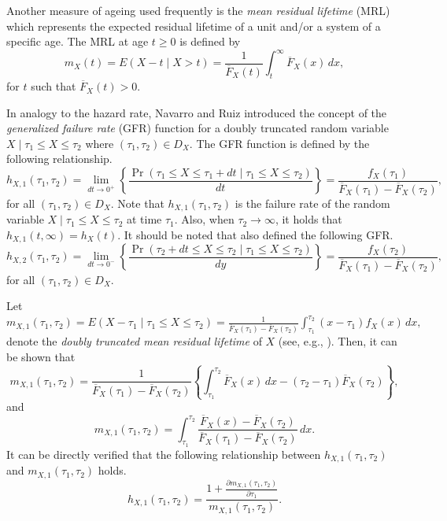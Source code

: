 \documentclass[11pt]{article}
\begin{document}
Another measure of ageing used frequently is the \textit{mean residual lifetime} (MRL) which represents the expected residual lifetime of a unit and/or a system of a specific age. The MRL at age $t \geq 0$ is defined by
\begin{equation*} \textstyle
	m_X(t) = E(X - t \mid X > t) = \frac{1}{\overline{F}_X(t)} \int_t^\infty \overline{F}_X(x) \, dx,
\end{equation*}
for $t$ such that $\overline{F}_X(t) > 0$.  

In analogy to the hazard rate, Navarro and Ruiz \cite{Navarro1996} introduced the concept of the \textit{generalized failure rate} (GFR) function for a doubly truncated random variable $X \mid \tau_1 \leq X \leq \tau_2$ where $(\tau_1, \tau_2) \in D_X$. The GFR function is defined by the following relationship.
\begin{equation} \textstyle
	h_{X,1}(\tau_1, \tau_2) = \lim_{dt \to 0^+} \left\{ \frac{\Pr(\tau_1 \leq X \leq \tau_1 + dt \mid \tau_1 \leq X \leq \tau_2)}{dt} \right\} = \frac{f_X(\tau_1)}{\overline{F}_X(\tau_1) - \overline{F}_X(\tau_2)},
\end{equation}
for all $(\tau_1, \tau_2) \in D_X$. Note that $h_{X,1}(\tau_1, \tau_2)$ is the failure rate of the random variable $X \mid \tau_1 \leq X \leq \tau_2$ at time $\tau_1$. Also, when $\tau_2 \to \infty$, it holds that $h_{X,1}(t, \infty) = h_X(t)$. It should be noted that \cite{Navarro1996} also defined the following GFR.
\begin{equation*} \textstyle
	h_{X,2}(\tau_1, \tau_2) = \lim_{dt \to 0^-} \left\{ \frac{\Pr(\tau_2 + dt \leq X \leq \tau_2 \mid \tau_1 \leq X \leq \tau_2)}{dy} \right\} = \frac{f_X(\tau_2)}{\overline{F}_X(\tau_1) - \overline{F}_X(\tau_2)},
\end{equation*}
for all $(\tau_1, \tau_2) \in D_X$.  

Let $ \textstyle m_{X,1}(\tau_1, \tau_2) = E(X - \tau_1 \mid \tau_1 \leq X \leq \tau_2) = \frac{1}{\overline{F}_X(\tau_1) - \overline{F}_X(\tau_2)} \int_{\tau_1}^{\tau_2} (x - \tau_1) f_X(x) \, dx, $
denote the \textit{doubly truncated mean residual lifetime} of $X$ (see, e.g., \cite{Ruiz1996}). Then, it can be shown that 
\begin{equation} \textstyle
	m_{X,1}(\tau_1, \tau_2) = \frac{1}{\overline{F}_X(\tau_1) - \overline{F}_X(\tau_2)} \left\{ \int_{\tau_1}^{\tau_2} \overline{F}_X(x) \, dx - (\tau_2 - \tau_1) \overline{F}_X(\tau_2) \right\},
\end{equation}
and
\begin{equation} \textstyle
	m_{X,1}(\tau_1, \tau_2) = \int_{\tau_1}^{\tau_2} \frac{\overline{F}_X(x) - \overline{F}_X(\tau_2)}{\overline{F}_X(\tau_1) - \overline{F}_X(\tau_2)} \, dx.
\end{equation}
It can be directly verified that the following relationship between $h_{X,1}(\tau_1, \tau_2)$ and $m_{X,1}(\tau_1, \tau_2)$ holds. 
\begin{equation}
	h_{X,1}(\tau_1, \tau_2) = \frac{1 + \frac{\partial m_{X,1}(\tau_1, \tau_2)}{\partial \tau_1}}{m_{X,1}(\tau_1, \tau_2)}.
\end{equation}
\end{document}
